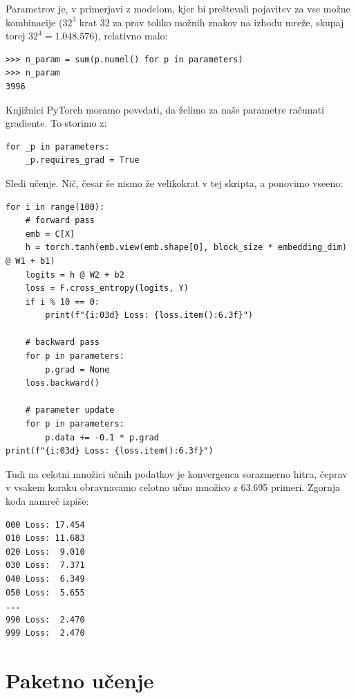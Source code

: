 Parametrov je, v primerjavi z modelom, kjer bi preštevali pojavitev za vse možne kombinacije ($32^3$ krat $32$ za prav toliko možnih znakov na izhodu mreže, skupaj torej $32^4=1.048.576$), relativno malo:
\vspace*{3mm}
\begin{lstlisting}
>>> n_param = sum(p.numel() for p in parameters)
>>> n_param
3996
\end{lstlisting}

Knjižnici PyTorch moramo povedati, da želimo za naše parametre računati gradiente. To storimo z:
\vspace*{3mm}
\begin{lstlisting}
for _p in parameters:
    _p.requires_grad = True
\end{lstlisting}

Sledi učenje. Nič, česar še nismo že velikokrat v tej skripta, a ponovimo vseeno:
\vspace*{3mm}
\begin{lstlisting}
for i in range(100):
    # forward pass
    emb = C[X]
    h = torch.tanh(emb.view(emb.shape[0], block_size * embedding_dim) @ W1 + b1)
    logits = h @ W2 + b2
    loss = F.cross_entropy(logits, Y)
    if i % 10 == 0:
        print(f"{i:03d} Loss: {loss.item():6.3f}")

    # backward pass
    for p in parameters:
        p.grad = None
    loss.backward()

    # parameter update
    for p in parameters:
        p.data += -0.1 * p.grad
print(f"{i:03d} Loss: {loss.item():6.3f}")
\end{lstlisting}

Tudi na celotni množici učnih podatkov
%
je konvergenca sorazmerno hitra, čeprav v vsakem koraku obravnavamo celotno učno množico z 63.695 primeri. Zgornja koda namreč izpiše:

\vspace*{3mm}
\begin{lstlisting}
000 Loss: 17.454
010 Loss: 11.683
020 Loss:  9.010
030 Loss:  7.371
040 Loss:  6.349
050 Loss:  5.655
...
990 Loss:  2.470
999 Loss:  2.470
\end{lstlisting}

\section{Paketno učenje}

